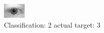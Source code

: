 \begin{figure}[h!]
\begin{center}
\includegraphics[width=0.60\columnwidth]{figures/ID664_class_2_target_3.png}
\end{center}
\caption{ Classification: 2 actual target: 3}
\label{fig:ID664_class_2_target_3}
\end{figure}
